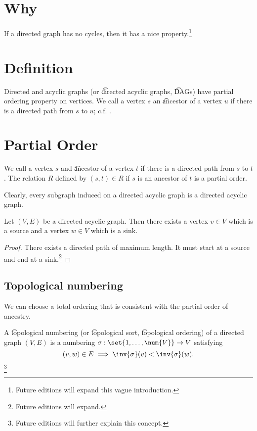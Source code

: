 

\section*{Why}

If a directed graph has no cycles, then it has a nice property.\footnote{Future editions will expand this vague introduction.}

\section*{Definition}

Directed and acyclic graphs (or \t{directed acyclic graphs}, \t{DAGs}) have partial ordering property on vertices.
We call a vertex $s$ an \t{ancestor} of a vertex $u$ if there is a directed path from $s$ to $u$; c.f. .

\section*{Partial Order}

We call a vertex $s$ and \t{ancestor} of a vertex $t$ if there is a directed path from $s$ to $t$.
The relation $R$ defined by $(s, t) \in R$ if $s$ is an ancestor of $t$ is a partial order.

Clearly, every subgraph induced on a directed acyclic graph is a directed acyclic graph.

\begin{proposition}
Let $(V, E)$ be a directed acyclic graph. Then there exists a vertex $v \in V$ which is a source and a vertex $w \in V$ which is a sink.
\begin{proof}There exists a directed path of maximum length. It must start at a source and end at a sink.\footnote{Future editions will expand.}\end{proof}
\end{proposition}

\subsection*{Topological numbering}

We can choose a total ordering that is consistent with the partial order of ancestry.

A \t{topological numbering} (or \t{topological sort}, \t{topological ordering}) of a directed graph $(V, E)$ is a numbering $\sigma : \set{1, \dots , \num{V}} \to V$ satisfying
\[
(v, w) \in E \implies \inv{\sigma }(v) < \inv{\sigma }(w).
\]\footnote{Future editions will further explain this concept.}

